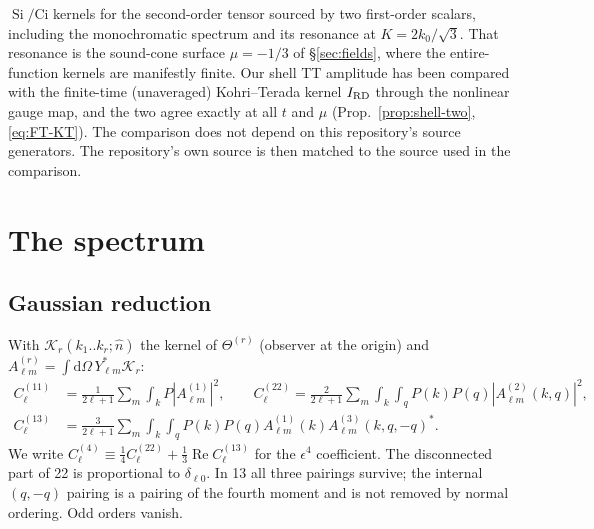\documentclass[11pt]{article}
\theoremstyle{definition}
\theoremstyle{remark}
\newcommand{\eps}{\epsilon}
\newcommand{\nh}{\hat n}
\newcommand{\dd}{\mathrm{d}}
\newcommand{\Si}{\operatorname{Si}}
\begin{document}
\begin{itemize}
  $\Si/\mathrm{Ci}$ kernels for the second-order tensor sourced by two first-order scalars,
  including the monochromatic spectrum and its resonance at $K=2k_0/\sqrt3$. That resonance is
  the sound-cone surface $\mu=-1/3$ of \S\ref{sec:fields}, where the entire-function kernels
  are manifestly finite. Our shell TT amplitude has been compared with the finite-time
  (unaveraged) Kohri--Terada kernel $I_{\rm RD}$ through the nonlinear gauge map, and the two
  agree exactly at all $t$ and $\mu$ (Prop.~\ref{prop:shell-two}, \eqref{eq:FT-KT}). The
  comparison does not depend on this repository's source generators. The repository's own
  source is then matched to the source used in the comparison.
\end{itemize}

\section{The spectrum}\label{sec:spec}

\subsection{Gaussian reduction}

With $\mathcal K_r(k_1..k_r;\nh)$ the kernel of $\Theta^{(r)}$ (observer at the origin) and
$A^{(r)}_{\ell m}=\int\dd\Omega\,Y^*_{\ell m}\mathcal K_r$:
\begin{align*}
C^{(11)}_\ell&=\tfrac{1}{2\ell+1}\textstyle\sum_m\int_kP|A^{(1)}_{\ell m}|^2,\qquad
C^{(22)}_\ell=\tfrac{2}{2\ell+1}\sum_m\int_k\int_qP(k)P(q)|A^{(2)}_{\ell m}(k,q)|^2,\\
C^{(13)}_\ell&=\tfrac{3}{2\ell+1}\textstyle\sum_m\int_k\int_qP(k)P(q)A^{(1)}_{\ell m}(k)A^{(3)}_{\ell m}(k,q,-q)^* .
\end{align*}
We write $C^{(4)}_\ell\equiv\frac14C^{(22)}_\ell+\frac13\operatorname{Re}C^{(13)}_\ell$ for the
$\eps^4$ coefficient. The disconnected part of 22 is proportional to $\delta_{\ell0}$. In 13 all three pairings
survive; the internal $(q,-q)$ pairing is a pairing of the fourth moment and is not removed by
normal ordering. Odd orders vanish.
\end{document}

